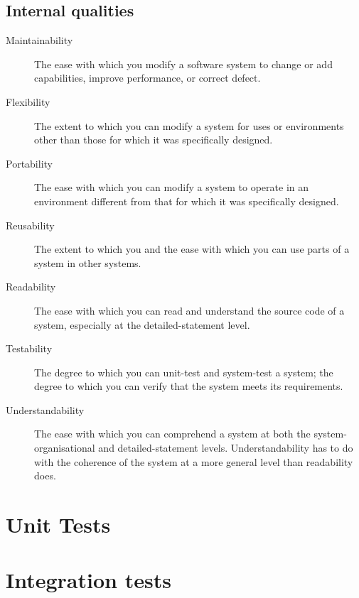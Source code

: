 \documentclass[a4paper, openany, oneside]{memoir}
\begin{document}
\subsection{Internal qualities}
\begin{description}
\item[Maintainability] The ease with which you modify a software system to change or add capabilities, improve performance, or correct defect.
\item[Flexibility] The extent to which you can modify a system for uses or environments other than those for which it was specifically designed.
\item[Portability] The ease with which you can modify a system to operate in an environment different from that for which it was specifically designed.
\item[Reusability] The extent to which you and the ease with which you can use parts of a system in other systems.
\item[Readability] The ease with which you can read and understand the source code of a system, especially at the detailed-statement level.
\item[Testability] The degree to which you can unit-test and system-test a system; the degree to which you can verify that the system meets its requirements.
\item[Understandability] The ease with which you can comprehend a system at both the system-organisational and detailed-statement levels. Understandability has to do with the coherence of the system at a more general level than readability does.
\end{description}

\section{Unit Tests}
\label{sec:unit-tests}

\section{Integration tests}
\label{sec:integration-tests}
\end{document}
